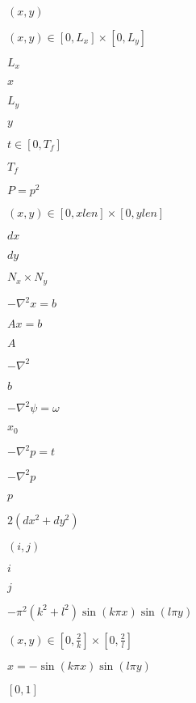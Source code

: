 \documentclass{article}
\begin{document}
$ (x,y) $
\pagebreak

$ (x,y)\in[0,L_x]\times[0,L_y] $
\pagebreak

$ L_x $
\pagebreak

$ x $
\pagebreak

$ L_y $
\pagebreak

$ y $
\pagebreak

$ t\in[0,T_f] $
\pagebreak

$ T_f $
\pagebreak

$ P = p^2 $
\pagebreak

$ (x,y)\in[0,xlen]\times[0,ylen] $
\pagebreak

$ dx $
\pagebreak

$ dy $
\pagebreak

$ N_x \times N_y $
\pagebreak

$ -\nabla ^ 2 x = b $
\pagebreak

$ Ax=b $
\pagebreak

$ A $
\pagebreak

$ -\nabla^2 $
\pagebreak

$ b $
\pagebreak

$ -\nabla ^ 2 \psi = \omega $
\pagebreak

$ x_0 $
\pagebreak

$ -\nabla^2 p = t $
\pagebreak

$ -\nabla^2 p $
\pagebreak

$ p $
\pagebreak

$ 2(dx^2 + dy^2) $
\pagebreak

$ (i,j) $
\pagebreak

$ i $
\pagebreak

$ j $
\pagebreak

$ - \pi ^2 (k^2 + l^2) \sin(k \pi x) \sin (l \pi y) $
\pagebreak

$ (x,y) \in [0, \frac{2}{k}] \times [0, \frac{2}{l}] $
\pagebreak

$ x = - \sin (k \pi x) \sin (l \pi y) $
\pagebreak

$ [0,1] $
\pagebreak
\end{document}
